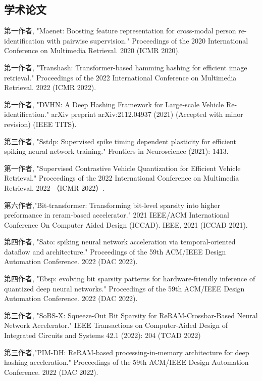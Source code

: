 
\begin{achievements}

\subsection*{学术论文}

\begin{bibliolist}{00}
  \item 第一作者, "Maenet: Boosting feature representation for cross-modal person re-identification with pairwise supervision." Proceedings of the 2020 International Conference on Multimedia Retrieval. 2020 (ICMR 2020).
  \item 第一作者, "Transhash: Transformer-based hamming hashing for efficient image retrieval." Proceedings of the 2022 International Conference on Multimedia Retrieval. 2022 (ICMR 2022).
  \item 第一作者,  "DVHN: A Deep Hashing Framework for Large-scale Vehicle Re-identification." arXiv preprint arXiv:2112.04937 (2021) (Accepted with minor revision) (IEEE TITS).
  \item 第三作者, "Sstdp: Supervised spike timing dependent plasticity for efficient spiking neural network training." Frontiers in Neuroscience (2021): 1413.
  \item 第一作者, "Supervised Contrastive Vehicle Quantization for Efficient Vehicle Retrieval." Proceedings of the 2022 International Conference on Multimedia Retrieval. 2022 （ICMR 2022）.
  \item 第六作者,"Bit-transformer: Transforming bit-level sparsity into higher preformance in reram-based accelerator." 2021 IEEE/ACM International Conference On Computer Aided Design (ICCAD). IEEE, 2021 (ICCAD 2021).
  \item 第四作者, "Sato: spiking neural network acceleration via temporal-oriented dataflow and architecture." Proceedings of the 59th ACM/IEEE Design Automation Conference. 2022 (DAC 2022).
  \item 第四作者, "Ebsp: evolving bit sparsity patterns for hardware-friendly inference of quantized deep neural networks." Proceedings of the 59th ACM/IEEE Design Automation Conference. 2022 (DAC 2022).
  \item 第三作者, "SoBS-X: Squeeze-Out Bit Sparsity for ReRAM-Crossbar-Based Neural Network Accelerator." IEEE Transactions on Computer-Aided Design of Integrated Circuits and Systems 42.1 (2022): 204 (TCAD 2022)
  \item 第三作者,"PIM-DH: ReRAM-based processing-in-memory architecture for deep hashing acceleration." Proceedings of the 59th ACM/IEEE Design Automation Conference. 2022 (DAC 2022).
\end{bibliolist}


\end{achievements}

